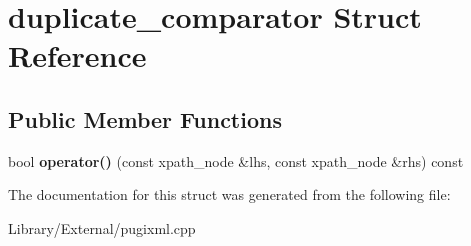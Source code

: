 \hypertarget{structduplicate__comparator}{}\section{duplicate\+\_\+comparator Struct Reference}
\label{structduplicate__comparator}
\subsection*{Public Member Functions}
\begin{DoxyCompactItemize}
\item 
\hypertarget{structduplicate__comparator_afa36b2cf7af3e0bc7e41b03995bd99d3}{}bool {\bfseries operator()} (const xpath\+\_\+node \&lhs, const xpath\+\_\+node \&rhs) const \label{structduplicate__comparator_afa36b2cf7af3e0bc7e41b03995bd99d3}

\end{DoxyCompactItemize}


The documentation for this struct was generated from the following file\+:\begin{DoxyCompactItemize}
\item 
Library/\+External/pugixml.\+cpp\end{DoxyCompactItemize}
